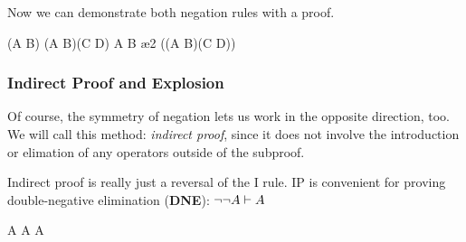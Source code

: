 \begin{fitchrule}
  \label{def:not-introduction-rule}
  \leavevmode
  \vspace{-0.9\baselineskip}
  \begin{fitchproof}
    \open
     {\ephi}      
     {\ebot}
    \close
     {\enot\ephi} 
  \end{fitchproof}
\end{fitchrule}

Now we can demonstrate both negation rules with a proof.

\begin{fitchproof}
   {\enot (A \eor B)}                       
  \open
   {(A \eor B)\eand(C \eand\enot D)}        
   {A \eor B}                               \ae{2}
   {\ebot}                                  
  \close
   {\enot((A \eor B)\eand(C \eand\enot D))} 
\end{fitchproof}

\subsubsection{Indirect Proof and Explosion}

Of course, the symmetry of negation lets us work in the opposite direction,
too. We will call this method: \emph{indirect proof}, since it does not involve
the introduction or elimation of any operators outside of the subproof.

\begin{fitchrule}
  \label{def:indirect-proof-rule}
  \leavevmode
  \vspace{-0.9\baselineskip}
  \begin{fitchproof}
    \open
     {\enot\ephi} 
     {\ebot}
    \close
     {\ephi}      
  \end{fitchproof}
\end{fitchrule}

Indirect proof is really just a reversal of the \enot I rule. IP is convenient
for proving double-negative elimination (\textbf{DNE}):
$\neg\neg A \vdash A$

\begin{fitchproof}
   {\enot\enot A} 
  \open
   {\enot A}      
   {\ebot}        
  \close
   {A}            
\end{fitchproof}

